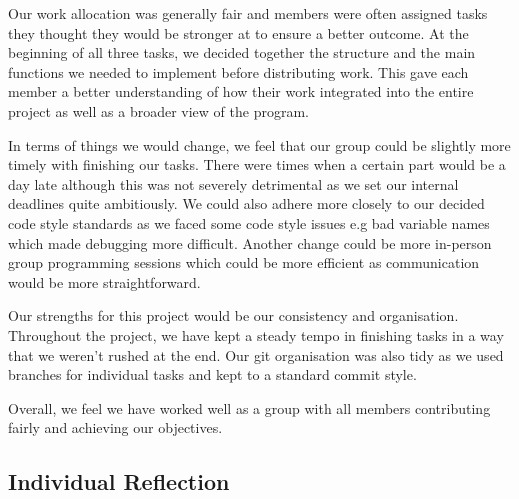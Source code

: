 \documentclass[11pt]{article}
\begin{document}
Our work allocation was generally fair and members were often assigned tasks they thought they would be stronger at to ensure a better outcome. At the beginning of all three tasks, we decided together the structure and the main functions we needed to implement before distributing work. This gave each member a better understanding of how their work integrated into the entire project as well as a broader view of the program.

In terms of things we would change, we feel that our group could be slightly more timely with finishing our tasks. There were times when a certain part would be a day late although this was not severely detrimental as we set our internal deadlines quite ambitiously. We could also adhere more closely to our decided code style standards as we faced some code style issues e.g bad variable names which made debugging more difficult. Another change could be more in-person group programming sessions which could be more efficient as communication would be more straightforward.

Our strengths for this project would be our consistency and organisation. Throughout the project, we have kept a steady tempo in finishing tasks in a way that we weren't rushed at the end. Our git organisation was also tidy as we used branches for individual tasks and kept to a standard commit style.

Overall, we feel we have worked well as a group with all members contributing fairly and achieving our objectives.

  \subsection*{Individual Reflection}

  
\end{document}
